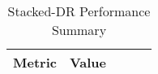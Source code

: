 \begin{table}[htbp]
\centering
\caption{Stacked-DR Performance Summary}
\label{tab:stacking}
\begin{tabular}{l|cccc}
\toprule
Metric & Value \\
\midrule
\bottomrule
\end{tabular}
\end{table}